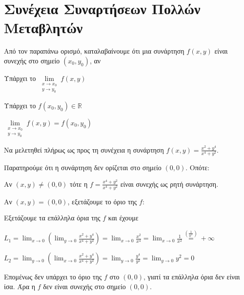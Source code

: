 \section{Συνέχεια Συναρτήσεων Πολλών Μεταβλητών}



\begin{rem}
  Από τον παραπάνω ορισμό, καταλαβαίνουμε ότι μια συνάρτηση $ f(x,y) $ 
  είναι συνεχής στο σημείο $ (x_{0}, y_{0}) $, αν
  \begin{myitemize}
    \item Υπάρχει το $ \lim\limits_{\substack{x\to x_{0} \\y \to y_{0}}} f(x,y) $
    \item Υπάρχει το $ f(x_{0}, y_{0}) \in \mathbb{R} $
    \item $  \lim\limits_{\substack{x\to x_{0} \\y \to y_{0}}} f(x,y)= 
      f(x_{0}, y_{0}) $
  \end{myitemize}
\end{rem}

\begin{example}
  Να μελετηθεί πλήρως ως προς τη συνέχεια η συνάρτηση 
  $ f(x,y) = \frac{x^{2}+y^{4}}{x^{4}+y^{2}} $.
  \begin{solution}
  \item {}
    Παρατηρούμε ότι η συνάρτηση δεν ορίζεται στο σημείο $ (0,0) $. Οπότε:

    Αν $ (x,y) \neq (0,0) $ τότε η $f= \frac{x^{4}+y^{2}}{x^{4}+y^{2}} $ είναι συνεχής 
    ως ρητή συνάρτηση.

    Αν $ (x,y)=(0,0) $, εξετάζουμε το όριο της $f$: 

    Εξετάζουμε τα επάλληλα όρια της $f$ και έχουμε
    \begin{myitemize}
      \item $ L_{1} = \lim_{x \to 0} 
        \left( 
          \lim_{y \to 0} \frac{x^{2}+y^{4}}{x^{4}+y^{2}} 
        \right) = \lim_{x \to 0} \frac{x^{2}}{x^{4}} = \lim_{x \to 0} \frac{1}{x^{2}}
        \overset{(\frac{1}{0^{+}})}{=} +\infty $
      \item $ L_{2} = \lim_{y \to 0} 
        \left(
          \lim_{x \to 0} 
          \frac{x^{2}+y^{4}}{x^{4}+y^{2}}
        \right) = \lim_{y \to 0} \frac{y^{4}}{y^{2}} = \lim_{y \to 0} y^{2} = 0 $
    \end{myitemize}
    Επομένως δεν υπάρχει το όριο της $f$ στο $ (0,0) $, γιατί τα επάλληλα όρια δεν 
    είναι ίσα.
    Άρα η $f$ δεν είναι συνεχής στο σημείο $(0,0)$.
  \end{solution}
\end{example}



